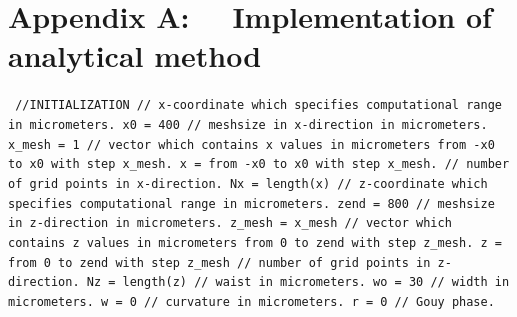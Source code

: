 \documentclass[a4paper]{article}
\begin{document}
	\section*{Appendix A: ~~Implementation of analytical method}
	\texttt{\noindent
		\textcolor{OliveGreen}{//INITIALIZATION\newline\newline
			// x-coordinate which specifies computational range in micrometers}.\newline
		x0 = 400 \newline
		\textcolor{OliveGreen}{// meshsize in x-direction in micrometers.}\newline
		x\_mesh = 1 \newline
		\textcolor{OliveGreen}{// vector which contains x values in micrometers from -x0 to x0 with step x\_mesh.}\newline
		x = from -x0 to x0 with step x\_mesh.\newline
		\textcolor{OliveGreen}{// number of grid points in x-direction.}\newline
		Nx = length(x)\newline
		\textcolor{OliveGreen}{// z-coordinate which specifies computational range in micrometers.}\newline
		zend = 800 \newline
		\textcolor{OliveGreen}{// meshsize in z-direction in micrometers.}\newline
		z\_mesh = x\_mesh \newline
		\textcolor{OliveGreen}{// vector which contains z values in micrometers from 0 to zend with step z\_mesh.}\newline
		z = from 0 to zend with step z\_mesh\newline
		\textcolor{OliveGreen}{// number of grid points in z-direction.}\newline
		Nz = length(z)\newline
		\textcolor{OliveGreen}{// waist in micrometers.}\newline
		wo = 30 \newline
		\textcolor{OliveGreen}{// width in micrometers.}\newline
		w = 0 \newline
		\textcolor{OliveGreen}{// curvature in micrometers.}\newline
		r = 0 \newline
		\textcolor{OliveGreen}{// Gouy phase.}\newline
}
\end{document}
